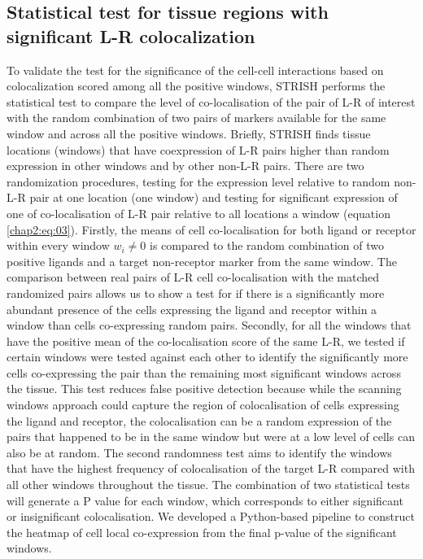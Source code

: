\subsection{Statistical test for tissue regions with significant L-R colocalization}
To validate the test for the significance of the cell-cell interactions based on colocalization scored among all the positive windows, STRISH performs the statistical test to compare the level of co-localisation of the pair of L-R of interest with the random combination of two pairs of markers available for the same window and across all the positive windows. Briefly, STRISH finds tissue locations (windows) that have coexpression of L-R pairs higher than random expression in other windows and by other non-L-R pairs. There are two randomization procedures, testing for the expression level relative to random non-L-R pair at one location (one window) and testing for significant expression of one of co-localisation of L-R pair relative to all locations a window (equation \ref{chap2:eq:03}). Firstly, the means of cell co-localisation for both ligand or receptor within every window $w_i \neq 0$ is compared to the random combination of two positive ligands and a target non-receptor marker from the same window. The comparison between real pairs of L-R cell co-localisation with the matched randomized pairs allows us to show a test for if there is a significantly more abundant presence of the cells expressing  the ligand and receptor within a window than cells co-expressing random pairs. Secondly, for all the windows that have the positive mean of the co-localisation score of the same L-R, we tested if certain windows were tested against each other to identify the significantly more cells co-expressing the pair than the remaining most significant windows across the tissue. This test reduces false positive detection because while the scanning windows approach could capture the region of colocalisation of cells expressing the ligand and receptor, the colocalisation can be a random expression of the pairs that happened to be in the same window but were at a low level of cells can also be at random. The second randomness test aims to identify the windows that have the highest frequency of colocalisation of the target L-R compared with all other windows throughout the tissue. The combination of two statistical tests will generate a P value for each window, which corresponds to either significant or insignificant colocalisation. We developed a Python-based pipeline to construct the heatmap of cell local co-expression from the final p-value of the significant windows. 
